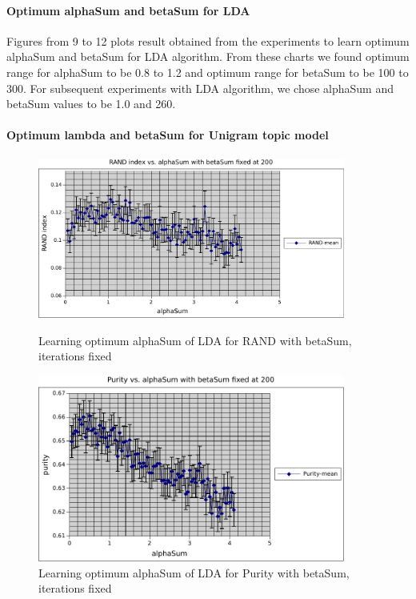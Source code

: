\paragraph{Optimum alphaSum and betaSum for LDA}Figures from 9 to 12 plots result obtained from the experiments to learn optimum alphaSum and betaSum for LDA algorithm. From these charts we found optimum range for alphaSum to be 0.8 to 1.2 and optimum range for betaSum to be 100 to 300. For subsequent experiments with LDA algorithm, we chose alphaSum and betaSum values to be 1.0 and 260.
\paragraph{Optimum lambda and betaSum for Unigram topic model}
\begin{figure}
    \centering
    \begin{minipage}{0.45\textwidth}
        \centering
        \includegraphics[width=0.9\textwidth]{alphaSum_rand_lda.pdf}
        \caption{Learning optimum alphaSum of LDA for RAND with betaSum, iterations fixed}
    \end{minipage}\hfill
    \begin{minipage}{0.45\textwidth}
        \centering
        \includegraphics[width=0.9\textwidth]{alphaSum_purity_lda.pdf}
        \caption{Learning optimum alphaSum of LDA for Purity with betaSum, iterations fixed}
    \end{minipage}
\end{figure}
